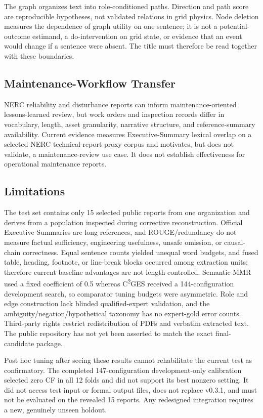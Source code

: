 \documentclass[applsci,article,submit,moreauthors]{Definitions/mdpi}
\newcommand{\cges}{C\textsuperscript{2}GES}
\begin{document}
The graph organizes text into role-conditioned paths. Direction and path score are reproducible hypotheses, not validated relations in grid physics. Node deletion measures the dependence of graph utility on one sentence; it is not a potential-outcome estimand, a do-intervention on grid state, or evidence that an event would change if a sentence were absent. The title must therefore be read together with these boundaries.

\subsection{Maintenance-Workflow Transfer}

NERC reliability and disturbance reports can inform maintenance-oriented lessons-learned review, but work orders and inspection records differ in vocabulary, length, asset granularity, narrative structure, and reference-summary availability. Current evidence measures Executive-Summary lexical overlap on a selected NERC technical-report proxy corpus and motivates, but does not validate, a maintenance-review use case. It does not establish effectiveness for operational maintenance reports.

\subsection{Limitations}

The test set contains only 15 selected public reports from one organization and derives from a population inspected during corrective reconstruction. Official Executive Summaries are long references, and ROUGE/redundancy do not measure factual sufficiency, engineering usefulness, unsafe omission, or causal-chain correctness. Equal sentence counts yielded unequal word budgets, and fused table, heading, footnote, or line-break blocks occurred among extraction units; therefore current baseline advantages are not length controlled. Semantic-MMR used a fixed coefficient of 0.5 whereas \cges{} received a 144-configuration development search, so comparator tuning budgets were asymmetric. Role and edge construction lack blinded qualified-expert validation, and the ambiguity/negation/hypothetical taxonomy has no expert-gold error counts. Third-party rights restrict redistribution of PDFs and verbatim extracted text. The public repository has not yet been asserted to match the exact final-candidate package.

Post hoc tuning after seeing these results cannot rehabilitate the current test as confirmatory. The completed 147-configuration development-only calibration selected zero CF in all 12 folds and did not support its best nonzero setting. It did not access test input or formal output files, does not replace v0.3.1, and must not be evaluated on the revealed 15 reports. Any redesigned integration requires a new, genuinely unseen holdout.
\end{document}
